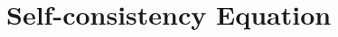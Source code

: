 \documentclass{article}
\begin{document}



\newpage
\section{Self-consistency Equation}
\end{document}

